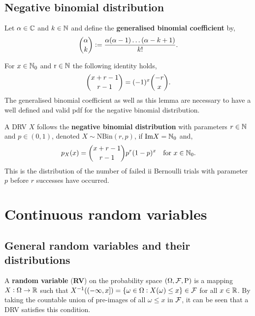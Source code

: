 \subsection{Negative binomial distribution}
\begingroup\belowdisplayskip=-20pt
\begin{definition}
    Let $\alpha\in\mathbb{C}$ and $k\in\mathbb{N}$ and define the \textbf{generalised binomial coefficient} by,\[
    \binom{\alpha}{k} := \frac{\alpha(\alpha-1)\ldots(\alpha-k+1)}{k!}\textcolor{black}{.}
    \]
\end{definition}
\endgroup

\begin{lemma}
    For $x\in\mathbb{N}_0$ and $\mathrm{r}\in\mathbb{N}$ the following identity holds,
    \[
    \binom{x+r-1}{r-1} = (-1)^x\binom{-r}{x}\textcolor{black}{.}
    \]
The generalised binomial coefficient as well as this lemma are necessary to have a well defined and valid pdf for the negative binomial distribution.
\end{lemma}

\begin{definition}
    A DRV $X$ follows the \textbf{negative binomial distribution} with parameters $r\in\mathbb{N}$ and $p \in (0,1)$, denoted $X \sim \text{NBin}(r,p)$, if $\text{Im}X = \mathbb{N}_0$ and, \[
        p_X(x) = \binom{x+r-1}{r-1}p^r(1-p)^x \quad \text{\textcolor{black}{for }$x\in\mathbb{N}_0$}\textcolor{black}{.}
    \]
This is the distribution of the number of failed ii Bernoulli trials with parameter $p$ before $r$ successes have occurred.
\end{definition}

\section{Continuous random variables}

\subsection{General random variables and their distributions}
\begin{definition}
    A \textbf{random variable} (\textbf{RV}) on the probability space $(\Omega,\mathcal{F},\mathrm{P})$ is a mapping $X:\Omega\rightarrow\mathbb{R}$ such that $X^{-1}((-\infty,x]) = \{\omega\in\Omega:X(\omega)\leq x\}\in\mathcal{F}$ for all $x\in\mathbb{R}$. By taking the countable union of pre-images of all $\omega\leq x$ in $\mathcal{F}$, it can be seen that a DRV satisfies this condition.
\end{definition}

